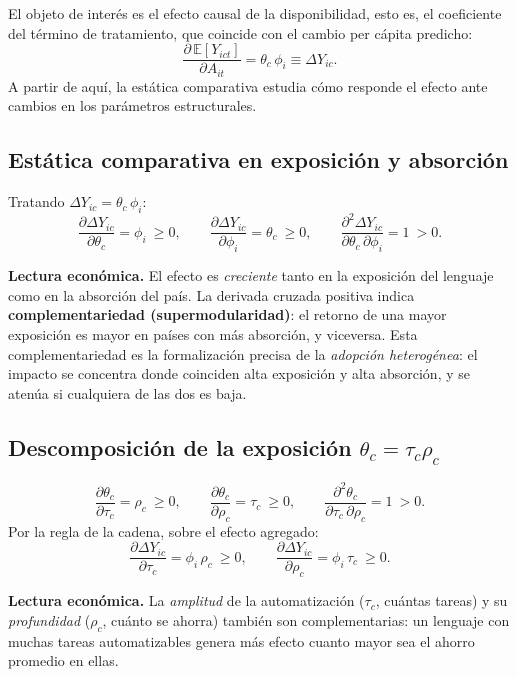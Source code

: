 \documentclass[11pt,a4paper]{article}
\begin{document}
El objeto de interés es el efecto causal de la disponibilidad, esto es, el coeficiente del término de tratamiento, que coincide con el cambio per cápita predicho:
\[
\frac{\partial\,\mathbb{E}[Y_{ict}]}{\partial A_{it}}=\theta_c\,\phi_i\equiv \Delta Y_{ic}.
\]
A partir de aquí, la estática comparativa estudia cómo responde el efecto ante cambios en los parámetros estructurales.

\subsection{Estática comparativa en exposición y absorción}

Tratando $\Delta Y_{ic}=\theta_c\,\phi_i$:
\[
\frac{\partial \Delta Y_{ic}}{\partial \theta_c}=\phi_i\ \ge 0,
\qquad
\frac{\partial \Delta Y_{ic}}{\partial \phi_i}=\theta_c\ \ge 0,
\qquad
\frac{\partial^2 \Delta Y_{ic}}{\partial \theta_c\,\partial \phi_i}=1\ >0.
\]

\noindent\textbf{Lectura económica.} El efecto es \textit{creciente} tanto en la exposición del lenguaje como en la absorción del país. La derivada cruzada positiva indica \textbf{complementariedad (supermodularidad)}: el retorno de una mayor exposición es mayor en países con más absorción, y viceversa. Esta complementariedad es la formalización precisa de la \textit{adopción heterogénea}: el impacto se concentra donde coinciden alta exposición y alta absorción, y se atenúa si cualquiera de las dos es baja.

\subsection{Descomposición de la exposición $\theta_c=\tau_c\rho_c$}

\[
\frac{\partial \theta_c}{\partial \tau_c}=\rho_c\ \ge 0,
\qquad
\frac{\partial \theta_c}{\partial \rho_c}=\tau_c\ \ge 0,
\qquad
\frac{\partial^2 \theta_c}{\partial \tau_c\,\partial \rho_c}=1\ >0.
\]
Por la regla de la cadena, sobre el efecto agregado:
\[
\frac{\partial \Delta Y_{ic}}{\partial \tau_c}=\phi_i\,\rho_c\ \ge 0,
\qquad
\frac{\partial \Delta Y_{ic}}{\partial \rho_c}=\phi_i\,\tau_c\ \ge 0.
\]

\noindent\textbf{Lectura económica.} La \textit{amplitud} de la automatización ($\tau_c$, cuántas tareas) y su \textit{profundidad} ($\rho_c$, cuánto se ahorra) también son complementarias: un lenguaje con muchas tareas automatizables genera más efecto cuanto mayor sea el ahorro promedio en ellas.
\end{document}
